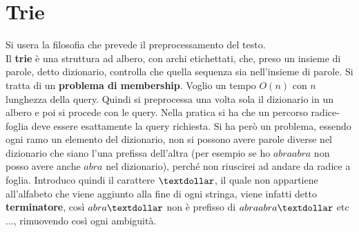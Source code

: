 \documentclass[a4paper,12pt, oneside]{book}
\begin{document}
\section{Trie}
Si usera la filosofia che prevede il preprocessamento del testo.\\
Il \textbf{trie} è una struttura ad albero, con archi etichettati,
che, preso un insieme di parole, detto dizionario, controlla che
quella sequenza sia nell'insieme di parole. Si tratta di un
\textbf{problema di membership}. Voglio un tempo $O(n)$ con $n$
lunghezza della query. Quindi si preprocessa una volta sola il
dizionario in un albero e poi si procede con le query. Nella pratica
si ha che un percorso radice-foglia deve essere esattamente la query
richiesta. Si ha però un problema, essendo ogni ramo un elemento del
dizionario, non si possono avere parole diverse nel dizionario che
siano l'una prefissa dell'altra (per esempio se ho $abraabra$ non
posso avere anche $abra$ nel dizionario), perché non riuscirei ad
andare da radice a foglia. Introduco quindi il carattere $\textdollar$, il quale
non appartiene all'alfabeto che viene aggiunto alla fine di ogni
stringa, viene infatti detto \textbf{terminatore}, così $abra\textdollar$ non è
prefisso di $abraabra\textdollar$ etc$\ldots$, rimuovendo così ogni ambiguità.\\
\end{document}
